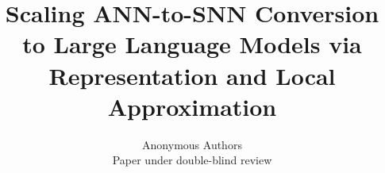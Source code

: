 \documentclass{article}
\title{Scaling ANN-to-SNN Conversion to Large Language Models via Representation and Local Approximation}
\author{Anonymous Authors \\
Paper under double-blind review}
\theoremstyle{plain}
\theoremstyle{definition}
\theoremstyle{remark}
\begin{document}
\maketitle

\begin{abstract}




\end{abstract}
\end{document}
